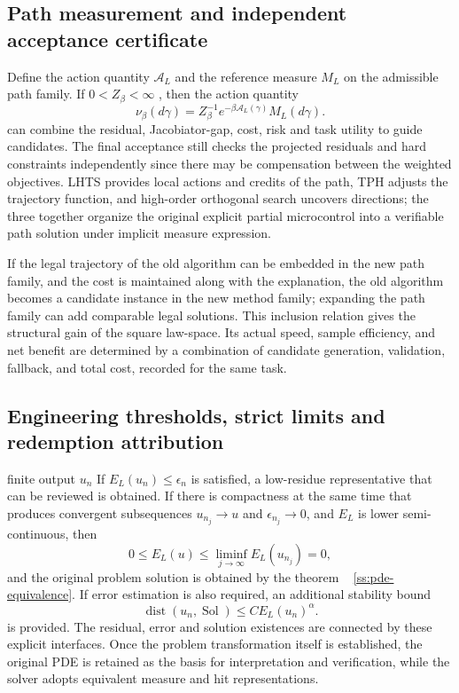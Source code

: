 \documentclass[11pt,a4paper]{article}
\theoremstyle{plain}
\theoremstyle{definition}
\theoremstyle{remark}
\begin{document}
\begin{CJK*}
\subsection { Path measurement and independent acceptance certificate }

Define the action quantity $\mathcal A_L$ and the reference measure $M_L$ on the admissible path family. If $0<Z_\beta<\infty$ , then the action quantity \[
 \nu_\beta(d\gamma)=Z_\beta^{-1}e^{-\beta\mathcal A_L(\gamma)}M_L(d\gamma).
\] can combine the residual, Jacobiator-gap, cost, risk and task utility to guide candidates. The final acceptance still checks the projected residuals and hard constraints independently since there may be compensation between the weighted objectives. LHTS provides local actions and credits of the path, TPH adjusts the trajectory function, and high-order orthogonal search uncovers directions; the three together organize the original explicit partial microcontrol into a verifiable path solution under implicit measure expression.

If the legal trajectory of the old algorithm can be embedded in the new path family, and the cost is maintained along with the explanation, the old algorithm becomes a candidate instance in the new method family; expanding the path family can add comparable legal solutions. This inclusion relation gives the structural gain of the square law-space. Its actual speed, sample efficiency, and net benefit are determined by a combination of candidate generation, validation, fallback, and total cost, recorded for the same task.

\subsection { Engineering thresholds, strict limits and redemption attribution }

finite output $u_n$ If $E_L(u_n)\le\epsilon_n$ is satisfied, a low-residue representative that can be reviewed is obtained. If there is compactness at the same time that produces convergent subsequences $u_{n_j}\to u$ and $\epsilon_{n_j}\to0$, and $E_L$ is lower semi-continuous, then \[
 0\le E_L(u)\le\liminf_{j\to\infty}E_L(u_{n_j})=0,
\] and the original problem solution is obtained by the theorem ~ \ref{ss:pde-equivalence}. If error estimation is also required, an additional stability bound \[
 \operatorname{dist}(u_n,\operatorname{Sol})
 \le C E_L(u_n)^\alpha.
\] is provided. The residual, error and solution existences are connected by these explicit interfaces. Once the problem transformation itself is established, the original PDE is retained as the basis for interpretation and verification, while the solver adopts equivalent measure and hit representations.


\end{CJK*}
\end{document}
